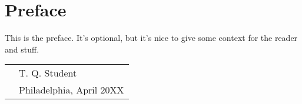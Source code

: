 \chapter{Preface}

This is the preface. It's optional, but it's nice to give some context for the reader and stuff.

\vspace{0.05\textheight}

\begin{tabular}{p{} l}
  & T. Q. Student             \\
  & Philadelphia, April 20XX  \\
\end{tabular}

